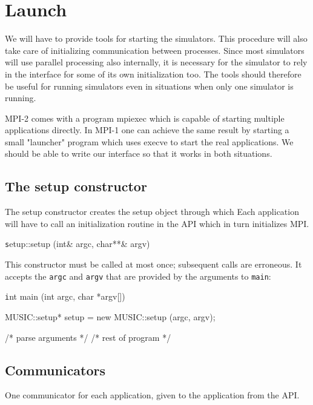\documentclass[a4paper]{report}
\newenvironment{metatext}%
{\color{blue}}%
{}
\newenvironment{head}%
{\texttt}%
{}
\newenvironment{code}%
{\texttt}%
{}
\begin{document}
\section{Launch}

We will have to provide tools for starting the simulators.  This
procedure will also take care of initializing communication between
processes.  Since most simulators will use parallel processing also
internally, it is necessary for the simulator to rely in the interface
for some of its own initialization too.  The tools should therefore be
useful for running simulators even in situations when only one
simulator is running.

\begin{metatext}
  MPI-2 comes with a program mpiexec which is capable of starting
  multiple applications directly.  In MPI-1 one can achieve the same
  result by starting a small "launcher" program which uses execve to
  start the real applications.  We should be able to write our interface
  so that it works in both situations.
\end{metatext}

\subsection{The setup constructor}

The setup constructor creates the setup object through which
Each application will have to call an initialization routine in the API
which in turn initializes MPI.

\begin{head}
  setup::setup (int\& argc, char**\& argv)
\end{head}

This constructor must be called at most once; subsequent calls are
erroneous.  It accepts the \verb|argc| and \verb|argv| that are
provided by the arguments to \verb|main|:

\begin{code}
int main (int argc, char *argv[])
{
  MUSIC::setup* setup = new MUSIC::setup (argc, argv);

  /* parse arguments */
  /* rest of program */
}
\end{code}

\subsection{Communicators}

One communicator for each application, given to the application from
the API.
\end{document}
